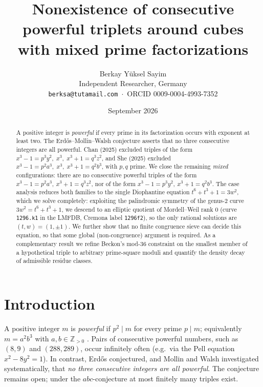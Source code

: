 \documentclass[11pt]{article}
\title{Nonexistence of consecutive powerful triplets around cubes\\ with mixed prime factorizations}
\author{Berkay Y\"uksel Sayim\\ \small Independent Researcher, Germany\\ \small \texttt{berksa@tutamail.com}~$\cdot$~ORCID 0009-0004-4993-7352}
\date{September 2026}
\theoremstyle{remark}
\newcommand{\Z}{\mathbb{Z}}
\begin{document}
\maketitle

\begin{abstract}
A positive integer is \emph{powerful} if every prime in its factorization occurs with exponent at least two. The Erd\H{o}s--Mollin--Walsh conjecture asserts that no three consecutive integers are all powerful. Chan (2025) excluded triples of the form $x^3-1=p^3y^2,\; x^3,\; x^3+1=q^3z^2$, and She (2025) excluded $x^3-1=p^2a^3,\; x^3,\; x^3+1=q^2b^3$, with $p,q$ prime. We close the remaining \emph{mixed} configurations: there are no consecutive powerful triples of the form $x^3-1=p^2a^3,\ x^3+1=q^3z^2$, nor of the form $x^3-1=p^3y^2,\ x^3+1=q^2b^3$. The case analysis reduces both families to the single Diophantine equation $t^6+t^3+1=3w^2$, which we solve completely: exploiting the palindromic symmetry of the genus-$2$ curve $3w^2=t^6+t^3+1$, we descend to an elliptic quotient of Mordell--Weil rank $0$ (curve \texttt{1296.k1} in the LMFDB, Cremona label \texttt{1296f2}), so the only rational solutions are $(t,w)=(1,\pm 1)$. We further show that no finite congruence sieve can decide this equation, so that some global (non-congruence) argument is required. As a complementary result we refine Beckon's mod-$36$ constraint on the smallest member of a hypothetical triple to arbitrary prime-square moduli and quantify the density decay of admissible residue classes.
\end{abstract}

\section{Introduction}

A positive integer $m$ is \emph{powerful} if $p^2 \mid m$ for every prime $p \mid m$; equivalently $m=a^2b^3$ with $a,b\in\Z_{>0}$ \cite{Golomb}. Pairs of consecutive powerful numbers, such as $(8,9)$ and $(288,289)$, occur infinitely often (e.g.\ via the Pell equation $x^2-8y^2=1$). In contrast, Erd\H{o}s \cite{Erdos76} conjectured, and Mollin and Walsh \cite{MollinWalsh86a,MollinWalsh86b} investigated systematically, that \emph{no three consecutive integers are all powerful}. The conjecture remains open; under the $abc$-conjecture at most finitely many triples exist.
\end{document}

